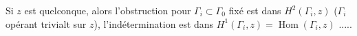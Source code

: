 Si $z$ est quelconque, alors l'obstruction pour $\Gamma_i\subset\Gamma_0$ fixé est dans $H^2(\Gamma_i,z)$
($\Gamma_i$ opérant trivialt sur $z$), l'indétermination est dans
$H^1(\Gamma_i,z)=\operatorname{Hom}(\Gamma_i,z)$ .....
